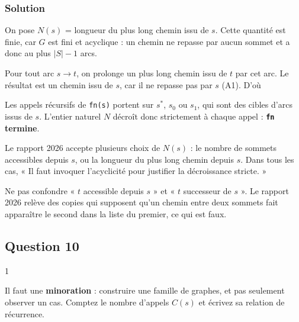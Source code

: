 \documentclass[11pt,a4paper]{article}
\newcommand{\equationajustee}[1]{%
  \sbox{\boiteequation}{$\displaystyle #1$}%
  \ifdim\wd\boiteequation>\linewidth
    \[\resizebox{\linewidth}{!}{\usebox{\boiteequation}}\]%
  \else
    \[#1\]%
  \fi}
\begin{document}
\hypertarget{solution-8}{%
\subsubsection{Solution}\label{solution-8}}

On pose \(N(s)\) = longueur du plus long chemin issu de \(s\). Cette quantité est finie, car \(G\) est fini et acyclique : un chemin ne repasse par aucun sommet et a donc au plus \(|S|-1\) arcs.

Pour tout arc \(s\to t\), on prolonge un plus long chemin issu de \(t\) par cet arc. Le résultat est un chemin issu de \(s\), car il ne repasse pas par \(s\) (A1). D'où

\equationajustee{N(s)\ge 1+N(t)>N(t).}

Les appels récursifs de \texttt{fn(s)} portent sur \(s^*\), \(s_0\) ou \(s_1\), qui sont des cibles d'arcs issus de \(s\). L'entier naturel \(N\) décroît donc strictement à chaque appel : \textbf{\texttt{fn} termine}.

\begin{jury}

Le rapport 2026 accepte plusieurs choix de \(N(s)\) : le nombre de sommets accessibles depuis \(s\), ou la longueur du plus long chemin depuis \(s\). Dans tous les cas, « Il faut invoquer l'acyclicité pour justifier la décroissance stricte. »

\end{jury}

\begin{piege}

Ne pas confondre « \(t\) accessible depuis \(s\) » et « \(t\) successeur de \(s\) ». Le rapport 2026 relève des copies qui supposent qu'un chemin entre deux sommets fait apparaître le second dans la liste du premier, ce qui est faux.

\end{piege}

\hypertarget{question-10}{%
\subsection{Question 10}\label{question-10}}

\begin{indication}{1}

Il faut une \textbf{minoration} : construire une famille de graphes, et pas seulement observer un cas. Comptez le nombre d'appels \(C(s)\) et écrivez sa relation de récurrence.

\end{indication}
\end{document}
